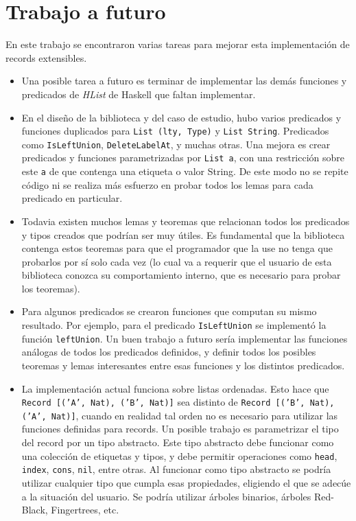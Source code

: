 
\chapter{Trabajo a futuro}
\label{ch:6}

En este trabajo se encontraron varias tareas para mejorar esta implementación de records extensibles.
\begin{itemize}
\item Una posible tarea a futuro es terminar de implementar las demás funciones y predicados de \textit{HList} de Haskell que faltan implementar.
\item En el diseño de la biblioteca y del caso de estudio, hubo varios predicados y funciones duplicados para \texttt{List (lty, Type)} y \texttt{List String}. Predicados como \texttt{IsLeftUnion}, \texttt{DeleteLabelAt}, y muchas otras. Una mejora es crear predicados y funciones parametrizadas por \texttt{List a}, con una restricción sobre este \texttt{a} de que contenga una etiqueta o valor String. De este modo no se repite código ni se realiza más esfuerzo en probar todos los lemas para cada predicado en particular.
\item Todavia existen muchos lemas y teoremas que relacionan todos los predicados y tipos creados que podrían ser muy útiles. Es fundamental que la biblioteca contenga estos teoremas para que el programador que la use no tenga que probarlos por sí solo cada vez (lo cual va a requerir que el usuario de esta biblioteca conozca su comportamiento interno, que es necesario para probar los teoremas).
\item Para algunos predicados se crearon funciones que computan su mismo resultado. Por ejemplo, para el predicado \texttt{IsLeftUnion} se implementó la función \texttt{leftUnion}. Un buen trabajo a futuro sería implementar las funciones análogas de todos los predicados definidos, y definir todos los posibles teoremas y lemas interesantes entre esas funciones y los distintos predicados.
\item La implementación actual funciona sobre listas ordenadas. Esto hace que \texttt{Record [('A', Nat), ('B', Nat)]} sea distinto de \texttt{Record [('B', Nat), ('A', Nat)]}, cuando en realidad tal orden no es necesario para utilizar las funciones definidas para records. Un posible trabajo es parametrizar el tipo del record por un tipo abstracto. Este tipo abstracto debe funcionar como una colección de etiquetas y tipos, y debe permitir operaciones como \texttt{head}, \texttt{index}, \texttt{cons}, \texttt{nil}, entre otras. Al funcionar como tipo abstracto se podría utilizar cualquier tipo que cumpla esas propiedades, eligiendo el que se adecúe a la situación del usuario. Se podría utilizar árboles binarios, árboles Red-Black, Fingertrees, etc.

\end{itemize}

